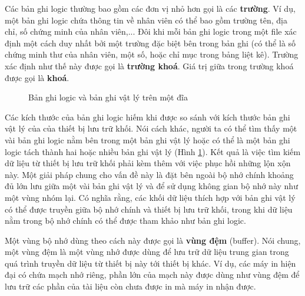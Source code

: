 Các bản ghi logic thường bao gồm các đơn vị nhỏ hơn gọi là các \textbf{trường}. Ví dụ, một
bản ghi logic chứa thông tin về nhân viên có thể bao gồm trường tên, địa chỉ, số chứng
minh của nhân viên,... Đôi khi mỗi bản ghi logic trong một file xác định một cách duy nhất
bởi một trường đặc biệt bên trong bản ghi (có thể là số chứng minh thư của nhân viên, một
số, hoặc chỉ mục trong bảng liệt kê). Trường xác định như thế này được gọi là
\textbf{trường khoá}. Giá trị giữa trong trường khoá được gọi là \textbf{khoá}.
\begin{figure}
\centering
\caption{Bản ghi logic và bản ghi vật lý trên một đĩa}
  \label{fig:fig1.12}
\end{figure}

Các kích thước của bản ghi logic hiếm khi được so sánh với kích thước bản ghi vật lý của
của thiết bị lưu trữ khối. Nói cách khác, người ta có thể tìm thấy một vài bản ghi logic
nằm bên trong một bản ghi vật lý hoặc có thể là một bản ghi logic tách thành hai hoặc
nhiều bản ghi vật lý (Hình \ref{fig:fig1.12}). Kết quả là việc tìm kiếm dữ liệu từ thiết
bị lưu trữ khối phải kèm thêm với việc phục hồi những lộn xộn này. Một giải pháp chung cho
vấn đề này là đặt bên ngoài bộ nhớ chính khoảng đủ lớn lưu giữa một vài bản ghi vật lý và
để sử dụng không gian bộ nhớ này như một vùng nhóm lại. Có nghĩa rằng, các khối dữ liệu
thích hợp với bản ghi vật lý có thể được truyền giữa bộ nhớ chính và thiết bị lưu trữ
khối, trong khi dữ liệu nằm trong bộ nhớ chính có thể được tham khảo như bản ghi logic.


Một vùng bộ nhớ dùng theo cách này được gọi là \textbf{vùng đệm} (buffer). Nói chung, một
vùng đệm là một vùng nhớ được dùng để lưu trữ dữ liệu trung gian trong quá trình truyền dữ
liệu từ thiết bị này tới thiết bị khác. Ví dụ, các máy in hiện đại có chứa mạch nhớ riêng,
phần lớn của mạch này được dùng như vùng đệm để lưu trữ các phần của tài liệu còn chưa
được in mà máy in nhận được.
  
